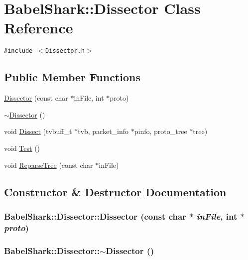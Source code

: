 \hypertarget{class_babel_shark_1_1_dissector}{
\section{BabelShark::Dissector Class Reference}
\label{class_babel_shark_1_1_dissector}
}
{\tt \#include $<$Dissector.h$>$}

\subsection*{Public Member Functions}
\begin{CompactItemize}
\item 
\hyperlink{class_babel_shark_1_1_dissector_58251765e8cdd8e140901c1d2d98c882}{Dissector} (const char $\ast$inFile, int $\ast$proto)
\item 
\hyperlink{class_babel_shark_1_1_dissector_f1bdd832d65a948d7e148650a1a48a8f}{$\sim$Dissector} ()
\item 
void \hyperlink{class_babel_shark_1_1_dissector_b0bc01fa1d8c676b0879c95397744156}{Dissect} (tvbuff\_\-t $\ast$tvb, packet\_\-info $\ast$pinfo, proto\_\-tree $\ast$tree)
\item 
void \hyperlink{class_babel_shark_1_1_dissector_64ceaa81e2445c9ec2b22414cbfaeefa}{Test} ()
\item 
void \hyperlink{class_babel_shark_1_1_dissector_bd6aaeb31ab6735c47075d2880c41e95}{ReparseTree} (const char $\ast$inFile)
\end{CompactItemize}


\subsection{Constructor \& Destructor Documentation}
\hypertarget{class_babel_shark_1_1_dissector_58251765e8cdd8e140901c1d2d98c882}{
\subsubsection[{Dissector}]{\setlength{\rightskip}{0pt plus 5cm}BabelShark::Dissector::Dissector (const char $\ast$ {\em inFile}, \/  int $\ast$ {\em proto})}}
\label{class_babel_shark_1_1_dissector_58251765e8cdd8e140901c1d2d98c882}


\hypertarget{class_babel_shark_1_1_dissector_f1bdd832d65a948d7e148650a1a48a8f}{
\subsubsection[{$\sim$Dissector}]{\setlength{\rightskip}{0pt plus 5cm}BabelShark::Dissector::$\sim$Dissector ()}}
\label{class_babel_shark_1_1_dissector_f1bdd832d65a948d7e148650a1a48a8f}




